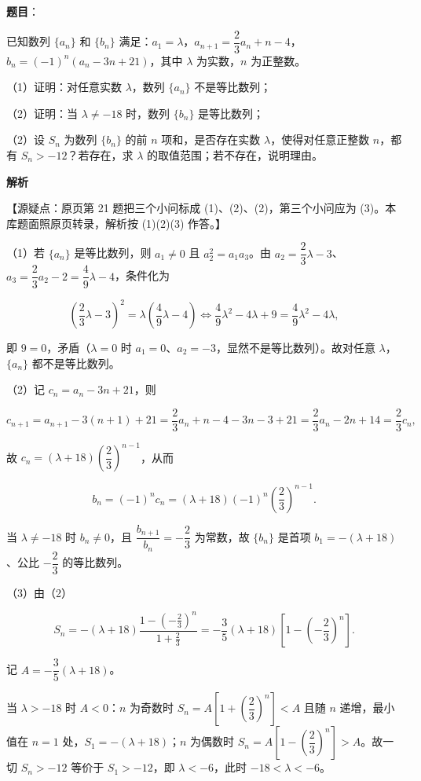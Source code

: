 \begin{answer}

\textbf{题目}：

已知数列 $\{a_n\}$ 和 $\{b_n\}$ 满足：$a_1=\lambda$，$a_{n+1}=\dfrac23a_n+n-4$，$b_n=(-1)^n(a_n-3n+21)$，其中 $\lambda$ 为实数，$n$ 为正整数。

（1）证明：对任意实数 $\lambda$，数列 $\{a_n\}$ 不是等比数列；

（2）证明：当 $\lambda\neq-18$ 时，数列 $\{b_n\}$ 是等比数列；

（2）设 $S_n$ 为数列 $\{b_n\}$ 的前 $n$ 项和，是否存在实数 $\lambda$，使得对任意正整数 $n$，都有 $S_n>-12$？若存在，求 $\lambda$ 的取值范围；若不存在，说明理由。

\textbf{解析}

【源疑点：原页第 21 题把三个小问标成 (1)、(2)、(2)，第三个小问应为 (3)。本库题面照原页转录，解析按 (1)(2)(3) 作答。】

（1）若 $\{a_n\}$ 是等比数列，则 $a_1\neq0$ 且 $a_2^2=a_1a_3$。由 $a_2=\dfrac23\lambda-3$、$a_3=\dfrac23a_2-2=\dfrac49\lambda-4$，条件化为

\nopagebreak[4]
\[\left(\frac23\lambda-3\right)^2=\lambda\left(\frac49\lambda-4\right)\iff\frac49\lambda^2-4\lambda+9=\frac49\lambda^2-4\lambda,\]

即 $9=0$，矛盾（$\lambda=0$ 时 $a_1=0$、$a_2=-3$，显然不是等比数列）。故对任意 $\lambda$，$\{a_n\}$ 都不是等比数列。

（2）记 $c_n=a_n-3n+21$，则

\nopagebreak[4]
\[c_{n+1}=a_{n+1}-3(n+1)+21=\frac23a_n+n-4-3n-3+21=\frac23a_n-2n+14=\frac23c_n,\]

故 $c_n=(\lambda+18)\left(\dfrac23\right)^{n-1}$，从而

\nopagebreak[4]
\[b_n=(-1)^n c_n=(\lambda+18)(-1)^n\left(\frac23\right)^{n-1}.\]

当 $\lambda\neq-18$ 时 $b_n\neq0$，且 $\dfrac{b_{n+1}}{b_n}=-\dfrac23$ 为常数，故 $\{b_n\}$ 是首项 $b_1=-(\lambda+18)$、公比 $-\dfrac23$ 的等比数列。

（3）由（2）

\nopagebreak[4]
\[S_n=-(\lambda+18)\frac{1-\left(-\frac23\right)^n}{1+\frac23}=-\frac35(\lambda+18)\left[1-\left(-\frac23\right)^n\right].\]

记 $A=-\dfrac35(\lambda+18)$。

当 $\lambda>-18$ 时 $A<0$：$n$ 为奇数时 $S_n=A\left[1+\left(\dfrac23\right)^n\right]<A$ 且随 $n$ 递增，最小值在 $n=1$ 处，$S_1=-(\lambda+18)$；$n$ 为偶数时 $S_n=A\left[1-\left(\dfrac23\right)^n\right]>A$。故一切 $S_n>-12$ 等价于 $S_1>-12$，即 $\lambda<-6$，此时 $-18<\lambda<-6$。


\end{answer}
